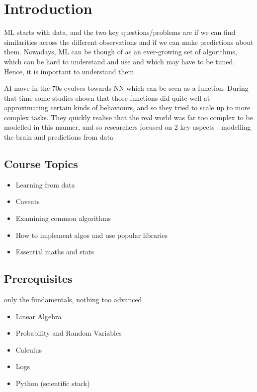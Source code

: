\section{Introduction}



\par{ML starts with data, and the two key questions/problems are if we can find similarities across the different observations and if we can make predictions about them. Nowadays, ML can be though of as an ever-growing set of algorithms, which can be hard to understand and use and which may have to be tuned. Hence, it is important to understand them}

\par{AI move in the 70s evolves towards NN which can be seen as a function. During that time some studies shown that those functions did quite well at approximating certain kinds of behaviours, and so they tried to scale up to more complex tasks. They quickly realise that the real world was far too complex to be modelled in this manner, and so researchers focused on 2 key aspects : modelling the brain and predictions from data}

\subsection{Course Topics}

	\begin{itemize}
		\item Learning from data
		\item Caveats
		\item Examining common algorithms
		\item How to implement algos and use popular libraries
		\item Essential maths and stats
	\end{itemize}

\subsection{Prerequisites}
	\par{only the fundamentals, nothing too advanced}

	\begin{itemize}
		\item Linear Algebra 
		\item Probability and Random Variables
		\item Calculus
		\item Logs
		\item Python (scientific stack)
	\end{itemize}



